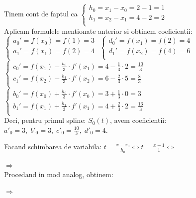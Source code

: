 \documentclass{article}
\begin{document}
Tinem cont de faptul ca
$\begin{cases}
  h_0 = x_1 - x_0 = 2 - 1 = 1 \\
  h_1 = x_2 - x_1 = 4 - 2 = 2 \\
\end{cases}$\\

Aplicam formulele mentionate anterior si obtinem coeficientii:\\

$\begin{cases}
  a_0' = f(x_0) = f(1) = 3 \\
  a_1' = f(x_1) = f(2) = 4 \\
\end{cases}$
\hspace{2.575cm}$\begin{cases}
  d_0' = f(x_1) = f(2) = 4 \\
  d_1' = f(x_2) = f(4) = 6 \\
\end{cases}$\\


$\begin{cases}
  c_0' = f(x_1) - \frac{h_0}{3} \cdot f'(x_1) = 4 - \frac{1}{3} \cdot 2 = \frac{10}{3} \\
  c_1' = f(x_2) - \frac{h_1}{3} \cdot f'(x_2) = 6 - \frac{2}{3} \cdot 5 = \frac{8}{3} \\
\end{cases}$
$\begin{cases}
  b_0' = f(x_0) + \frac{h_0}{3} \cdot f'(x_0) = 3 + \frac{1}{3} \cdot 0 = 3 \\
  b_1' = f(x_1) + \frac{h_1}{3} \cdot f'(x_1) = 4 + \frac{2}{3} \cdot 2 = \frac{16}{3} \\
\end{cases}$\\


\tabto{0.5cm} Deci, pentru primul spline: $S_0(t)$, avem coeficientii: $a'_0 = 3,\; b'_0 = 3,\; c'_0 = \frac{10}{3},\; d'_0 = 4$.

Facand schimbarea de variabila: $t = \frac{x-x_0}{h_0} \iff t = \frac{x-1}{1} \iff$ 


$\Longrightarrow$ \\


Procedand in mod analog, obtinem:

$\Longrightarrow$ \\
\end{document}
